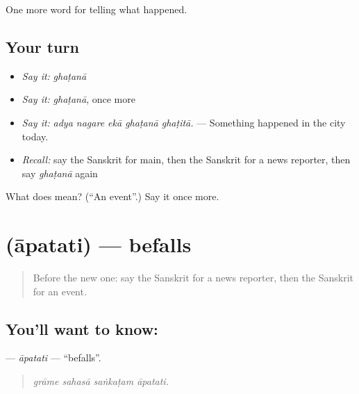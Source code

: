\begin{grammarlens}[title={What you've built}]
One more word for telling what happened.
\end{grammarlens}

\subsection*{Your turn}
\begin{itemize}
\raggedright
  \item \emph{Say it:} \emph{ghaṭanā}
  \item \emph{Say it:} \emph{ghaṭanā}, once more
  \item \emph{Say it:} \emph{adya nagare ekā ghaṭanā ghaṭitā.} — Something happened in the city today.
  \item \emph{Recall:} say the Sanskrit for main, then the Sanskrit for a news reporter, then say \emph{ghaṭanā} again
\end{itemize}

\begin{tcolorbox}[breakable,colback=teal!4,colframe=teal!35!black,title={Before you move on}]
What does  mean? (\textquotedblleft{}An event\textquotedblright{}.) Say it once more.
\end{tcolorbox}
\section[\texorpdfstring{\sk{आपतति} (āpatati)}{आपतति (āpatati)}]{ (āpatati) — befalls}

\label{lesson:SA-C310-apatati}



\begin{quote}
Before the new one: say the Sanskrit for a news reporter, then the Sanskrit for an event.
\end{quote}

\subsection*{You'll want to know: }
\textbf{} — \emph{āpatati} — \textquotedblleft{}befalls\textquotedblright{}.

\begin{quote}
   
\end{quote}

\begin{quote}
\emph{grāme sahasā saṅkaṭam āpatati.}
\end{quote}

